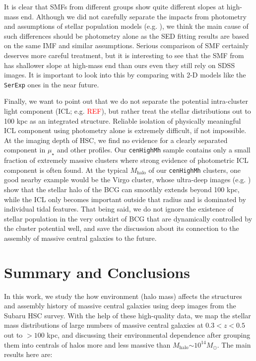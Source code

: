 \documentclass{emulateapj}
\def\rbcg{\texttt{cenHighMh}}
\def\mhalo{{$M_{\mathrm{halo}}$}}
\def\mden{{$\mu_{\star}$}}
\newcommand{\addref}{{\textcolor{red}{REF}}}
\begin{document}
\begin{CJK*}{UTF8}{gbsn}
    It is clear that SMFs from different groups show quite different slopes 
    at high-mass end. 
    Although we did not carefully separate the impacts from photometry and 
    assumptions of stellar population models (e.g. \citealt{Bernardi2016}), 
    we think the main cause of such differences should be photometry alone as 
    the SED fitting results are based on the same IMF and similar assumptions.  
    Serious comparison of SMF certainly deserves more careful treatment, 
    but it is interesting to see that the SMF from \citep{Bernardi2013} has 
    shallower slope at high-mass end than ours even they still rely on SDSS
    images. 
    It is important to look into this by comparing with 2-D models like the 
    \texttt{SerExp} ones in the near future.     
      
    Finally, we want to point out that we do not separate the potential intra-cluster 
    light component (ICL; e.g. \addref{}), but rather treat the stellar distributions 
    out to 100 kpc as an integrated structure.
    Reliable isolation of physically meaningful ICL component using photometry 
    alone is extremely difficult, if not impossible. 
    At the imaging depth of HSC, we find no evidence for a clearly separated 
    component in \mden{} and other profiles. 
    Our \rbcg{} sample contains only a small fraction of extremely massive clusters 
    where strong evidence of photometric ICL component is often found. 
    At the typical \mhalo{} of our \rbcg{} clusters, one good nearby example would be 
    the Virgo cluster, whose ultra-deep images (e.g. \citealt{Mihos2016}) show
    that the stellar halo of the BCG can smoothly extends beyond 100 kpc, while the 
    ICL only becomes important outside that radius and is dominated by individual 
    tidal features. 
    That being said, we do not ignore the existence of stellar population in the 
    very outskirt of BCG that are dynamically controlled by the cluster potential 
    well, and save the discussion about its connection to the assembly of massive 
    central galaxies to the future.  

\section{Summary and Conclusions}
    \label{sec:summary}

    In this work, we study the how environment (halo mass) affects the structures and
    assembly history of massive central galaxies using deep images from the Subaru HSC 
    survey.
    With the help of these high-quality data, we map the stellar mass distributions of 
    large numbers of massive central galaxies at $0.3 < z < 0.5$ out to $>100$ kpc, 
    and discussing their environmental dependence after grouping them into centrals of 
    halos more and less massive than \mhalo{}$\sim 10^{14} M_{\odot}$. 
    The main results here are:
    

\end{CJK*}
\end{document}
